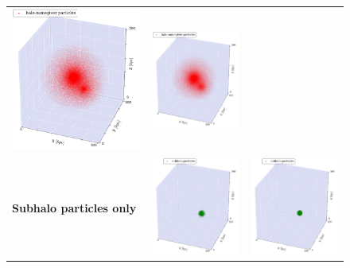 \begin{subfigures}
\begin{figure}[!htbp]
{\begin{tabular}{|p{.5cm} c c|}
			{\includegraphics[width = .42\textwidth]{images/dice-two/dice-two-halo-only-saddle.png}} \hspace*{-1em} 		&
			{\includegraphics[width = .42\textwidth]{images/dice-two/dice-two-halo-only-iter.png}} \hspace*{-1em}		\\
			\begin{sideways}{ \hspace{2cm}\textbf{Subhalo particles only} }\end{sideways}	 \hspace*{-1em}			 &
			{\includegraphics[width = .42\textwidth]{images/dice-two/dice-two-plot-subhalo-saddle.png}} &
			{\includegraphics[width = .42\textwidth]{images/dice-two/dice-two-plot-subhalo-iter.png}} \\

\end{tabular}}
\end{figure}
\end{subfigures}

